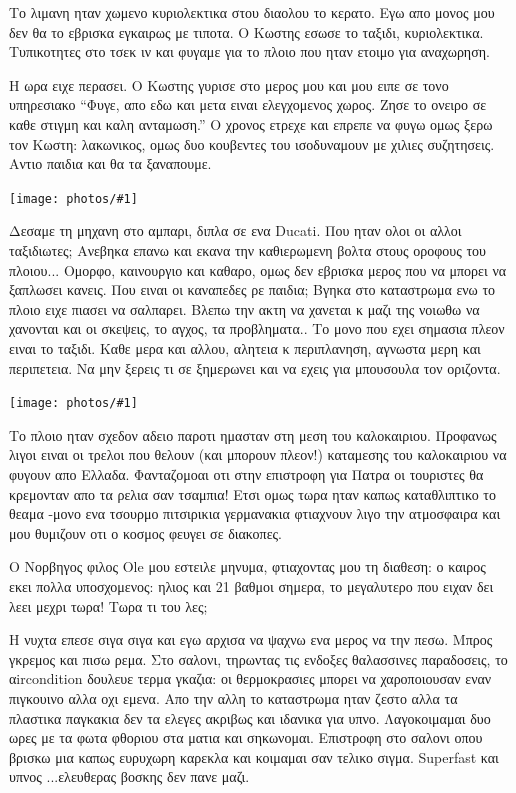 \documentclass[11pt, letterpaper]{book}
\newcommand\photo[1]{\noindent\texttt{[image: photos/\#1]}}
\begin{document}
Το λιμανη ηταν χωμενο κυριολεκτικα στου διαολου το κερατο. Εγω απο μονος μου δεν θα το εβρισκα εγκαιρως με τιποτα. Ο Κωστης εσωσε το ταξιδι, κυριολεκτικα. Τυπικοτητες στο τσεκ ιν και φυγαμε για το πλοιο που ηταν ετοιμο για αναχωρηση.

Η ωρα ειχε περασει. Ο Κωστης γυρισε στο μερος μου και μου ειπε σε τονο υπηρεσιακο ``Φυγε, απο εδω και μετα ειναι ελεγχομενος χωρος. Ζησε το ονειρο σε καθε στιγμη και καλη ανταμωση.'' Ο χρονος ετρεχε και επρεπε να φυγω ομως ξερω τον Κωστη: λακωνικος, ομως δυο κουβεντες του ισοδυναμουν με χιλιες συζητησεις. Αντιο παιδια και θα τα ξαναπουμε.

\photo{3.jpg}

Δεσαμε τη μηχανη στο αμπαρι, διπλα σε ενα Ducati. Που ηταν ολοι οι αλλοι ταξιδιωτες; Ανεβηκα επανω και εκανα την καθιερωμενη βολτα στους οροφους του πλοιου...  Ομορφο, καινουργιο και καθαρο, ομως δεν εβρισκα μερος που να μπορει να ξαπλωσει κανεις. Που ειναι οι καναπεδες ρε παιδια; Βγηκα στο καταστρωμα ενω το πλοιο ειχε πιασει να σαλπαρει. Βλεπω την ακτη να χανεται κ μαζι της νοιωθω να χανονται και οι σκεψεις, το αγχος, τα προβληματα.. Το μονο που εχει σημασια πλεον ειναι το ταξιδι. Καθε μερα και αλλου, αλητεια κ περιπλανηση, αγνωστα μερη και περιπετεια. Να μην ξερεις τι σε ξημερωνει και να εχεις για μπουσουλα τον οριζοντα.

\photo{4.jpg}

Tο πλοιο ηταν σχεδον αδειο παροτι ημασταν στη μεση του καλοκαιριου. Προφανως λιγοι ειναι οι τρελοι που θελουν (και μπορουν πλεον!) καταμεσης του καλοκαιριου να φυγουν απο Ελλαδα. Φανταζομοαι οτι στην επιστροφη για Πατρα οι τουριστες θα κρεμονταν απο τα ρελια σαν τσαμπια! Ετσι ομως τωρα ηταν καπως καταθλιπτικο το θεαμα -μονο ενα τσουρμο πιτσιρικια γερμανακια φτιαχνουν λιγο την ατμοσφαιρα και μου θυμιζουν οτι ο κοσμος φευγει σε διακοπες.

Ο Νορβηγος φιλος Ole μου εστειλε μηνυμα, φτιαχοντας μου τη διαθεση: ο καιρος εκει πολλα υποσχομενος: ηλιος και 21 βαθμοι σημερα, το μεγαλυτερο που ειχαν δει λεει μεχρι τωρα! Τωρα τι του λες;

Η νυχτα επεσε σιγα σιγα και εγω αρχισα να ψαχνω ενα μερος να την πεσω. Μπρος γκρεμος και πισω ρεμα. Στο σαλονι, τηρωντας τις ενδοξες θαλασσινες παραδοσεις, το αircondition δουλευε τερμα γκαζια: οι θερμοκρασιες μπορει να χαροποιουσαν εναν πιγκουινο αλλα οχι εμενα. Απο την αλλη το καταστρωμα ηταν ζεστο αλλα τα πλαστικα παγκακια δεν τα ελεγες ακριβως και ιδανικα για υπνο. Λαγοκοιμαμαι δυο ωρες με τα φωτα φθοριου στα ματια και σηκωνομαι. Επιστροφη στο σαλονι οπου βρισκω μια καπως ευρυχωρη καρεκλα και κοιμαμαι σαν τελικο σιγμα. Superfast και υπνος ...ελευθερας βοσκης δεν πανε μαζι. 
\end{document}
